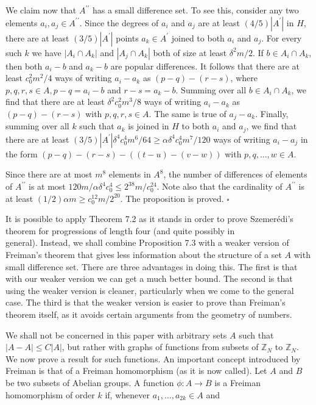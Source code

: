 \documentclass[10pt]{article}
\begin{document}
We claim now that $A^{\prime \prime}$ has a small difference set. To see this, consider any two elements $a_{i}, a_{j} \in A^{\prime \prime}$. Since the degrees of $a_{i}$ and $a_{j}$ are at least $(4 / 5)\left|A^{\prime}\right|$ in $H$, there are at least $(3 / 5)\left|A^{\prime}\right|$ points $a_{k} \in A^{\prime}$ joined to both $a_{i}$ and $a_{j}$. For every such $k$ we have $\left|A_{i} \cap A_{k}\right|$ and $\left|A_{j} \cap A_{k}\right|$ both of size at least $\delta^{2} m / 2$. If $b \in A_{i} \cap A_{k}$, then both $a_{i}-b$ and $a_{k}-b$ are popular differences. It follows that there are at least $c_{0}^{2} m^{2} / 4$ ways of writing $a_{i}-a_{k}$ as $(p-q)-(r-s)$, where $p, q, r, s \in A, p-q=a_{i}-b$ and $r-s=a_{k}-b$. Summing over all $b \in A_{i} \cap A_{k}$, we find that there are at least $\delta^{2} c_{0}^{2} m^{3} / 8$ ways of writing $a_{i}-a_{k}$ as $(p-q)-(r-s)$ with $p, q, r, s \in A$. The same is true of $a_{j}-a_{k}$. Finally, summing over all $k$ such that $a_{k}$ is joined in $H$ to both $a_{i}$ and $a_{j}$, we find that there are at least $(3 / 5)\left|A^{\prime}\right| \delta^{4} c_{0}^{4} m^{6} / 64 \geqslant \alpha \delta^{4} c_{0}^{4} m^{7} / 120$ ways of writing $a_{i}-a_{j}$ in the form $(p-q)-(r-s)-((t-u)-(v-w))$ with $p, q, \ldots, w \in A$.

Since there are at most $m^{8}$ elements in $A^{8}$, the number of differences of elements of $A^{\prime \prime}$ is at most $120 m / \alpha \delta^{4} c_{0}^{4} \leqslant 2^{38} m / c_{0}^{24}$. Note also that the cardinality of $A^{\prime \prime}$ is at least $(1 / 2) \alpha m \geqslant c_{0}^{12} m / 2^{20}$. The proposition is proved. \(\square\)

It is possible to apply Theorem 7.2 as it stands in order to prove Szemerédi's theorem for progressions of length four (and quite possibly in\\
general). Instead, we shall combine Proposition 7.3 with a weaker version of Freiman's theorem that gives less information about the structure of a set $A$ with small difference set. There are three advantages in doing this. The first is that with our weaker version we can get a much better bound. The second is that using the weaker version is cleaner, particularly when we come to the general case. The third is that the weaker version is easier to prove than Freiman's theorem itself, as it avoids certain arguments from the geometry of numbers.

We shall not be concerned in this paper with arbitrary sets $A$ such that $|A-A| \leqslant C|A|$, but rather with graphs of functions from subsets of $\mathbb{Z}_{N}$ to $\mathbb{Z}_{N}$. We now prove a result for such functions. An important concept introduced by Freiman is that of a Freiman homomorphism (as it is now called). Let $A$ and $B$ be two subsets of Abelian groups. A function $\phi: A \rightarrow B$ is a Freiman homomorphism of order $k$ if, whenever $a_{1}, \ldots, a_{2 k} \in A$ and
\end{document}
